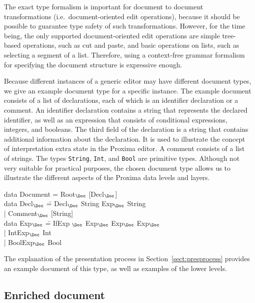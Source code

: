 The exact type formalism is important for document to document transformations (i.e.\ document-oriented edit operations), because it should be possible to guarantee type safety of such transformations. However, for the time being, the only supported document-oriented edit operations are simple tree-based operations, such as cut and paste, and basic operations on lists, such as selecting a segment of a list. Therefore, using a context-free grammar formalism for specifying the document structure is expressive enough.
 
Because different instances of a generic editor may have different document types, we give an example document type for a specific instance. The example document consists of a list of declarations, each of which is an identifier declaration or a comment. An identifier declaration contains a string that represents the declared identifier, as well as an expression that consists of conditional expressions, integers, and booleans. The third field of the declaration is a string that contains additional information about the declaration. It is used to illustrate the concept of interpretation extra state in the Proxima editor. A comment consists of a list of strings. The types {\tt String}, {\tt Int}, and {\tt Bool} are primitive types. Although not very suitable for practical purposes, the chosen document type allows us to illustrate the different aspects of the Proxima data levels and layers.

\noindent
\ttfamily
\begin{tabbing}
data Document = Root$_{\Doc}$ [Decl$_{\Doc}$]\\
data Decl$_{\Doc}$ \= = Decl$_{\Doc}$ String Exp$_{\Doc}$ String\\
                            \> | Comment$_{\Doc}$ [String]\\
data Exp$_{\Doc}$ \= =  IfExp $_{\Doc}$ Exp$_{\Doc}$ Exp$_{\Doc}$ Exp$_{\Doc}$\\
                 \> | IntExp$_{\Doc}$ Int\\
                 \> | BoolExp$_{\Doc}$ Bool\\
\end{tabbing}
\rmfamily

The explanation of the presentation process in Section~\ref{sect:presprocess} provides an example document of this type, as well as examples of the lower levels.

%																
\subsection{Enriched document} \label{sect:enrLevel}

